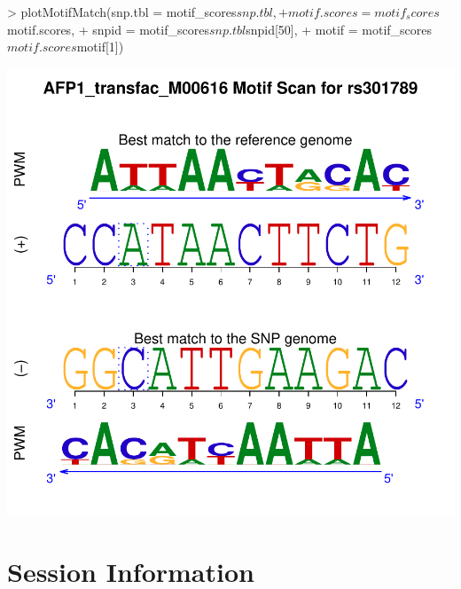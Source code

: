 \documentclass[a4paper,10pt]{article}
\begin{document}
\begin{Schunk}
\begin{Sinput}
> plotMotifMatch(snp.tbl = motif_scores$snp.tbl,
+                motif.scores = motif_scores$motif.scores,
+                snpid = motif_scores$snp.tbl$snpid[50],
+                motif = motif_scores$motif.scores$motif[1])
\end{Sinput}
\end{Schunk}
\includegraphics{atsnp-008}

\section{Session Information}
\end{document}
